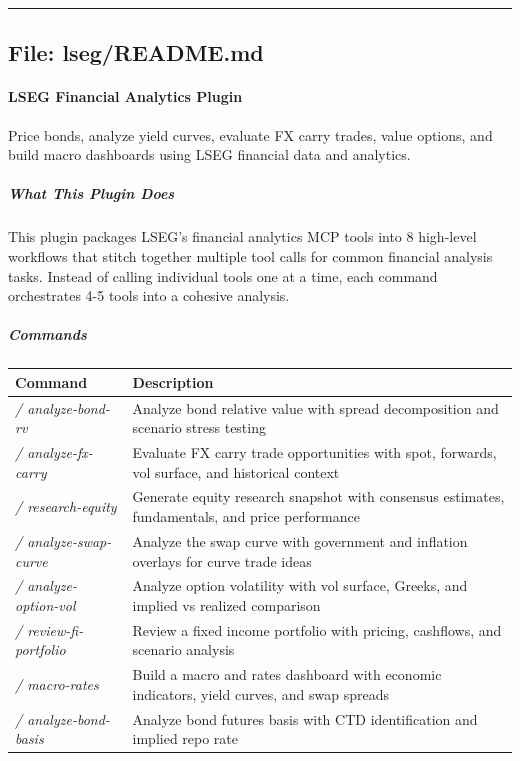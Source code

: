 \documentclass[11pt]{article}
\begin{document}
\vspace{0.8em}\hrule\vspace{0.8em}

\subsection{File: lseg/README.md}\label{file:lseg-README.md}

\paragraph{LSEG Financial Analytics Plugin}\mbox{}\par

Price bonds, analyze yield curves, evaluate FX carry trades, value options, and build macro dashboards using LSEG financial data and analytics.


\subparagraph{What This Plugin Does}\mbox{}\par

This plugin packages LSEG's financial analytics MCP tools into 8 high-level workflows that stitch together multiple tool calls for common financial analysis tasks. Instead of calling individual tools one at a time, each command orchestrates 4-5 tools into a cohesive analysis.


\subparagraph{Commands}\mbox{}\par

\begingroup
\small
\setlength{\tabcolsep}{2pt}
\begin{longtable}{>{\RaggedRight\arraybackslash\hspace{0pt}}p{}>{\RaggedRight\arraybackslash\hspace{0pt}}p{}}
\toprule
{} \textbf{Command} & \textbf{Description} \\
\midrule
{} \emph{/ analyze-bond-rv} & Analyze bond relative value with spread decomposition and scenario stress testing \\
{} \emph{/ analyze-fx-carry} & Evaluate FX carry trade opportunities with spot, forwards, vol surface, and historical context \\
{} \emph{/ research-equity} & Generate equity research snapshot with consensus estimates, fundamentals, and price performance \\
{} \emph{/ analyze-swap-curve} & Analyze the swap curve with government and inflation overlays for curve trade ideas \\
{} \emph{/ analyze-option-vol} & Analyze option volatility with vol surface, Greeks, and implied vs realized comparison \\
{} \emph{/ review-fi-portfolio} & Review a fixed income portfolio with pricing, cashflows, and scenario analysis \\
{} \emph{/ macro-rates} & Build a macro and rates dashboard with economic indicators, yield curves, and swap spreads \\
{} \emph{/ analyze-bond-basis} & Analyze bond futures basis with CTD identification and implied repo rate \\
\bottomrule
\end{longtable}
\endgroup
\end{document}
